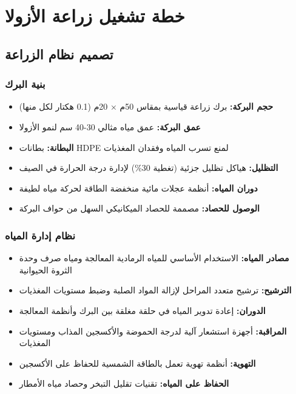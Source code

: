 \section{خطة تشغيل زراعة الأزولا}

\subsection{تصميم نظام الزراعة}

\subsubsection{بنية البرك}
\begin{itemize}
    \item \textbf{حجم البركة:} برك زراعة قياسية بمقاس 50م × 20م (0.1 هكتار لكل منها)
    \item \textbf{عمق البركة:} عمق مياه مثالي 30-40 سم لنمو الأزولا
    \item \textbf{البطانة:} بطانات HDPE لمنع تسرب المياه وفقدان المغذيات
    \item \textbf{التظليل:} هياكل تظليل جزئية (تغطية 30\%) لإدارة درجة الحرارة في الصيف
    \item \textbf{دوران المياه:} أنظمة عجلات مائية منخفضة الطاقة لحركة مياه لطيفة
    \item \textbf{الوصول للحصاد:} مصممة للحصاد الميكانيكي السهل من حواف البركة
\end{itemize}

\subsubsection{نظام إدارة المياه}
\begin{itemize}
    \item \textbf{مصادر المياه:} الاستخدام الأساسي للمياه الرمادية المعالجة ومياه صرف وحدة الثروة الحيوانية
    \item \textbf{الترشيح:} ترشيح متعدد المراحل لإزالة المواد الصلبة وضبط مستويات المغذيات
    \item \textbf{الدوران:} إعادة تدوير المياه في حلقة مغلقة بين البرك وأنظمة المعالجة
    \item \textbf{المراقبة:} أجهزة استشعار آلية لدرجة الحموضة والأكسجين المذاب ومستويات المغذيات
    \item \textbf{التهوية:} أنظمة تهوية تعمل بالطاقة الشمسية للحفاظ على الأكسجين
    \item \textbf{الحفاظ على المياه:} تقنيات تقليل التبخر وحصاد مياه الأمطار
\end{itemize}


